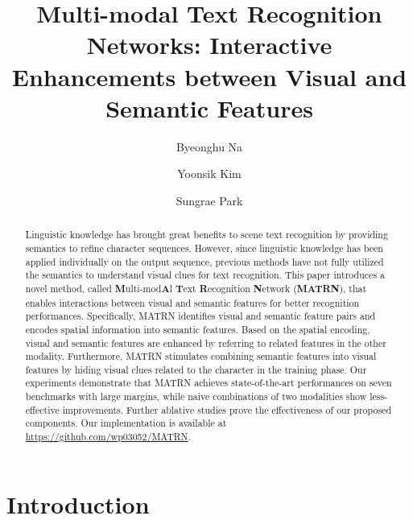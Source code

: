 \documentclass[runningheads]{llncs}
\begin{document}
\pagestyle{headings}
\mainmatter

\title{Multi-modal Text Recognition Networks: Interactive Enhancements between Visual and Semantic Features} 

\author{Byeonghu Na\and
Yoonsik Kim\and
Sungrae Park}
\maketitle

\begin{abstract}

Linguistic knowledge has brought great benefits to scene text recognition by providing semantics to refine character sequences. However, since linguistic knowledge has been applied individually on the output sequence, previous methods have not fully utilized the semantics to understand visual clues for text recognition. This paper introduces a novel method, called \textbf{M}ulti-mod\textbf{A}l \textbf{T}ext \textbf{R}ecognition \textbf{N}etwork (\textbf{MATRN}), that enables interactions between visual and semantic features for better recognition performances. Specifically, MATRN identifies visual and semantic feature pairs and encodes spatial information into semantic features. Based on the spatial encoding, visual and semantic features are enhanced by referring to related features in the other modality. Furthermore, MATRN stimulates combining semantic features into visual features by hiding visual clues related to the character in the training phase. Our experiments demonstrate that MATRN achieves state-of-the-art performances on seven benchmarks with large margins, while naive combinations of two modalities show less-effective improvements. Further ablative studies prove the effectiveness of our proposed components. Our implementation is available at \url{https://github.com/wp03052/MATRN}.
\end{abstract}


\section{Introduction}
\end{document}

